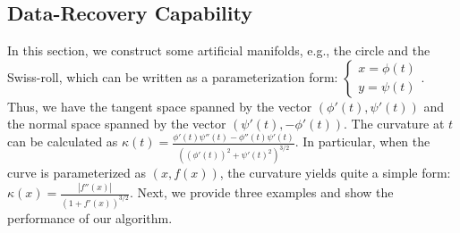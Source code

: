 \documentclass{article}
\theoremstyle{remark}
\newtheorem{example}{Example}
\begin{document}
\subsection{Data-Recovery Capability}
In this section, we construct some artificial manifolds, e.g., the circle and the Swiss-roll, which can be written as a parameterization form:
$
\left\{
\begin{array}{c}
x = \phi(t)\\
y = \psi(t)
\end{array}
\right.
$.
Thus, we have the tangent space spanned by the vector $(\phi'(t),\psi'(t))$ and the normal space spanned by the vector $(\psi'(t),-\phi'(t))$. The curvature at $t$ can be calculated as
$\kappa(t) = \frac{\phi'(t)\psi''(t)-\phi''(t)\psi'(t)}{((\phi'(t))^2+\psi'(t)^2)^{3/2}}.$
In particular, when the curve is parameterized as $(x,f(x))$, the curvature yields quite a simple form:
$\kappa(x) = \frac{|f''(x)|}{(1+f'(x))^{3/2}}$. Next, we provide three examples and show the performance of our algorithm.
\end{document}
